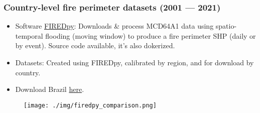 \documentclass{beamer}
\begin{document}
\begin{frame}[t, allowframebreaks]
    \frametitle{Country-level fire perimeter datasets (2001 --- 2021)
    ~\cite{mahood2022}}
    \begin{itemize}
        \item Software \href{https://github.com/earthlab/firedpy}{FIREDpy}: 
            Downloads \& process MCD64A1 data using spatio-temporal flooding 
            (moving window)  to produce a fire perimeter SHP (daily or by 
            event). Source code available, it's also dokerized.
        \item Datasets: Created using FIREDpy, calibrated by region, and for 
            download by country.
        \item Download Brazil 
           \href{https://scholar.colorado.edu/concern/datasets/05741s90}{here}.
    \end{itemize}
    \begin{figure}
        \centering
        \texttt{[image: ./img/firedpy\_comparison.png]}
    \end{figure} 
\end{frame}
\end{document}

